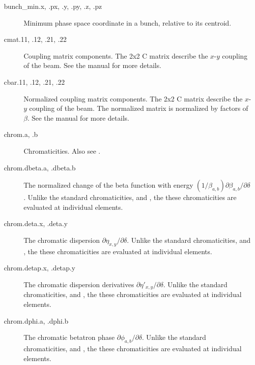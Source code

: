 \begin{description}
  \item[bunch_min.x, .px, .y, .py, .z, .pz] \Newline {}
Minimum phase space coordinate in a bunch, relative to its centroid.

  \item[cmat.11, .12, .21, .22] \Newline {}
Coupling matrix components. The 2x2 C matrix describe the $x$-$y$ coupling of the beam.
See the \bmad manual for more details.

  \item[cbar.11, .12, .21, .22] \Newline {}
Normalized coupling matrix components. The 2x2 C matrix describe the $x$-$y$ coupling of the beam.
The normalized matrix is normalized by factors of $\beta$. See the \bmad manual for more details.

  \item[chrom.a, .b] \Newline {}
Chromaticities. Also see .

  \item[chrom.dbeta.a, .dbeta.b] \Newline {}
The normalized change of the beta function with energy
$(1/\beta_{a,b})\partial\beta_{a,b}/\partial\delta$. Unlike the standard chromaticities, and ,
the these chromaticities are evaluated at individual elements.

  \item[chrom.deta.x, .deta.y] \Newline {}
The chromatic dispersion $\partial\eta_{x,y}/\partial\delta$. Unlike the standard
chromaticities, and , the these chromaticities are evaluated at
individual elements.

  \item[chrom.detap.x, .detap.y] \Newline {}
The chromatic dispersion derivatives $\partial\eta'_{x,y}/\partial\delta$. Unlike the standard
chromaticities, and , the these chromaticities are evaluated at
individual elements.

  \item[chrom.dphi.a, .dphi.b] \Newline {}
The chromatic betatron phase $\partial\phi_{a,b}/\partial\delta$. Unlike the standard
chromaticities, and , the these chromaticities are evaluated at
individual elements.


\end{description}
